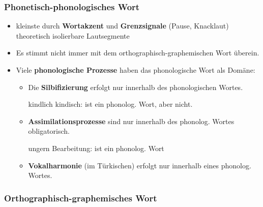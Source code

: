 \begin{frame}
\frametitle{Phonetisch-phonologisches Wort}

\begin{itemize}
	\item kleinste durch \textbf{Wortakzent} und \textbf{Grenzsignale} (Pause, Knacklaut) theoretisch isolierbare Lautsegmente
	\item Es stimmt nicht immer mit dem orthographisch-graphemischen Wort überein.

\pause 
	
	\item Viele \textbf{phonologische Prozesse} haben das phonologische Wort als Domäne:
	
	\begin{itemize}
		\item Die \textbf{Silbifizierung} erfolgt nur innerhalb des phonologischen Wortes.
		
		\ea kindlich \vs kindisch:  ist ein phonolog. Wort, aber  nicht.
		\z 

\pause 

		\item \textbf{Assimilationsprozesse} sind nur innerhalb des phonolog. Wortes obligatorisch.
		
		\ea ungern \vs Bearbeitung:  ist ein phonolog. Wort
		\z 

\pause 
		
		\item \textbf{Vokalharmonie} (\zB im Türkischen) erfolgt nur innerhalb eines phonolog. Wortes.
	\end{itemize}
\end{itemize}

\end{frame}


\subsubsection{Orthographisch-graphemisches Wort}


